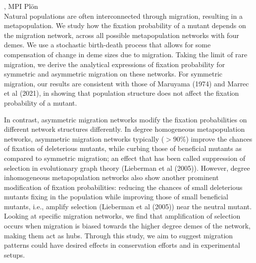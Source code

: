 \documentclass[12pt,a4paper]{article}
\begin{document}
\bigskip\bigskip

, MPI Plön \\[2ex] Natural populations are often interconnected through migration, resulting in a metapopulation. We study how the fixation probability of a mutant depends on the migration network, across all possible metapopulation networks with four demes. We use a stochastic birth-death process that allows for some compensation of change in deme sizes due to migration. Taking the limit of rare migration, we derive the analytical expressions of fixation probability for symmetric and asymmetric migration on these networks. For symmetric migration, our results are consistent with those of Maruyama (1974) and Marrec et al (2021), in showing that population structure does not affect the fixation probability of a mutant. 

 In contrast, asymmetric migration networks modify the fixation probabilities on different network structures differently. In degree homogeneous metapopulation networks, asymmetric migration networks typically ($>90$\%) improve the chances of fixation of deleterious mutants, while curbing those of beneficial mutants as compared to symmetric migration; an effect that has been called suppression of selection in evolutionary graph theory (Lieberman et al (2005)). However, degree inhomogeneous metapopulation networks also show another prominent modification of fixation probabilities: reducing the chances of small deleterious mutants fixing in the population while improving those of small beneficial mutants, i.e., amplify selection (Lieberman et al (2005)) near the neutral mutant. Looking at specific migration networks, we find that amplification of selection occurs when migration is biased towards the higher degree demes of the network, making them act as hubs. Through this study, we aim to suggest migration patterns could have desired effects in conservation efforts and in experimental setups. 

\bigskip\bigskip
\end{document}
